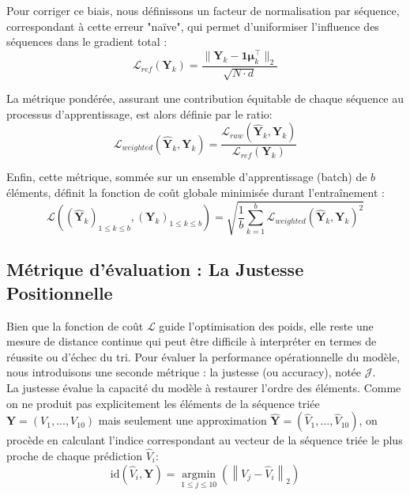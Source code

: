 Pour corriger ce biais, nous définissons un facteur de normalisation par séquence, correspondant à cette erreur "naïve", qui permet d'uniformiser l'influence des séquences dans le gradient total :
\begin{equation}
    \mathcal{L}_{ref}(\mathbf{Y}_k) = \frac{\| \mathbf{Y}_k - \mathbf{1}\boldsymbol{\mu}_k^\top \|_2}{\sqrt{N \cdot d}}
\label{eq:Lref}
\end{equation}

La métrique pondérée, assurant une contribution équitable de chaque séquence au processus d'apprentissage, est alors définie par le ratio:
\begin{equation}
\label{eq:weighteusipco}
    \mathcal{L}_{weighted}(\hat{\mathbf{Y}}_k, \mathbf{Y}_k) = \frac{\mathcal{L}_{raw}(\hat{\mathbf{Y}}_k, \mathbf{Y}_k)}{\mathcal{L}_{ref}(\mathbf{Y}_k)}
\end{equation}

Enfin, cette métrique, sommée sur un ensemble d'apprentissage (batch) de $b$ éléments, définit la fonction de coût globale minimisée durant l'entraînement :
\begin{equation}
    \mathcal{L}\left((\hat{\mathbf{Y}}_k)_{1 \leq k \leq b}, (\mathbf{Y}_k)_{1 \leq k \leq b}\right) = \sqrt{\frac{1}{b} \sum_{k=1}^b \mathcal{L}_{weighted}(\hat{\mathbf{Y}}_k, \mathbf{Y}_k)^2}
\end{equation}

\subsection{Métrique d'évaluation : La Justesse Positionnelle}
Bien que la fonction de coût $\mathcal{L}$ guide l'optimisation des poids, elle reste une mesure de distance continue qui peut être difficile à interpréter en termes de réussite ou d'échec du tri. Pour évaluer la performance opérationnelle du modèle, nous introduisons une seconde métrique : la justesse (ou accuracy), notée $\mathcal{J}$.\\

La justesse évalue la capacité du modèle à restaurer l'ordre des éléments. Comme on ne produit pas explicitement les éléments de la séquence triée $\mathbf{Y} = (V_1, ..., V_{10})$ mais seulement une approximation $\hat{\mathbf{Y}} = (\hat{V}_1, ..., \hat{V}_{10})$, on procède en calculant l'indice correspondant au vecteur de la séquence triée le plus proche de chaque prédiction $\hat{V}_i$:
\begin{equation*}
    \mathrm{id}(\hat{V}_i, \mathbf{Y}) = \underset{1 \leq j \leq 10}{\operatorname{argmin}}(\left\| V_j - \hat{V}_i \right\|_2)
\end{equation*}

